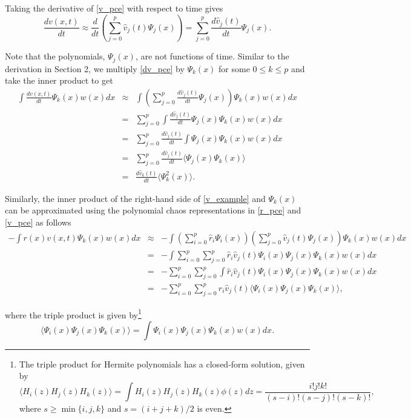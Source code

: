 \documentclass[11pt]{article}
\numberwithin{equation}{section}
\begin{document}
Taking the derivative of \eqref{v_pce} with respect to time gives 
\begin{equation}
\frac{dv(x, t)}{dt} \approx \frac{d}{dt} \left( \sum_{j=0}^p \hat{v}_j(t) \Psi_j(x) \right) = \sum_{j=0}^p \frac{d \hat{v}_j(t)}{dt} \Psi_j(x). \label{dv_pce}
\end{equation}

Note that the polynomials, $\Psi_j(x)$, are not functions of time. Similar to the derivation in Section 2, we multiply \eqref{dv_pce} by $\Psi_k(x)$ for some $0 \leq k \leq  p$ and take the inner product to get
\begin{eqnarray}
\int \frac{dv(x, t)}{dt} \Psi_k(x) w(x) dx & \approx & \int \left( \sum_{j=0}^p \frac{d\hat{v}_j(t)}{dt} \Psi_j(x) \right) \Psi_k(x) w(x) dx  \nonumber \\
& = & \sum_{j=0}^p \int \frac{d\hat{v}_j(t)}{dt} \Psi_j(x) \Psi_k(x) w(x) dx \nonumber \\
& = & \sum_{j=0}^p \frac{d\hat{v}_j(t)}{dt} \int \Psi_j(x) \Psi_k(x) w(x) dx \nonumber \\
& = & \sum_{j=0}^p \frac{d\hat{v}_j(t)}{dt} \langle \Psi_j(x) \Psi_k(x) \rangle \nonumber \\
& = & \frac{d\hat{v}_k(t)}{dt} \langle \Psi_k^2(x) \rangle. \label{lhs}
\end{eqnarray}

Similarly, the inner product of the right-hand side of \eqref{v_example} and $\Psi_k(x)$ can be approximated using the polynomial chaos representations in \eqref{r_pce} and \eqref{v_pce} as follows
\begin{eqnarray}
 - \int r(x) v(x, t) \Psi_k(x) w(x) dx & \approx & - \int \left( \sum_{i=0}^p \hat{r}_i \Psi_i(x) \right) \left( \sum_{j=0}^p \hat{v}_j(t) \Psi_j(x) \right) \Psi_k(x) w(x) dx \nonumber \\
& = & - \int \sum_{i=0}^p \sum_{j=0}^p \hat{r}_i \hat{v}_j(t) \Psi_i(x) \Psi_j(x) \Psi_k(x) w(x) dx \nonumber \\
& = & - \sum_{i=0}^p \sum_{j=0}^p \int \hat{r}_i \hat{v}_j(t) \Psi_i(x) \Psi_j(x) \Psi_k(x) w(x) dx \nonumber \\
& = & - \sum_{i=0}^p \sum_{j=0}^p \hat{r}_i \hat{v}_j(t) \langle \Psi_i(x) \Psi_j(x) \Psi_k(x) \rangle, \label{rhs}
\end{eqnarray}

where the triple product is given by\footnote{The triple product for Hermite polynomials has a closed-form solution, given by
\begin{equation*}
\langle H_i(z) H_j(z) H_k(z) \rangle = \int H_i(z) H_j(z) H_k(z) \phi(z) dz = \frac{i! j! k!}{(s-i)! (s-j)! (s-k)!},
\end{equation*}
where $s \geq \min\{i, j, k\}$ and $s = (i + j + k)/2$ is even.}
\begin{equation}
\langle \Psi_i(x) \Psi_j(x) \Psi_k(x) \rangle = \int \Psi_i(x) \Psi_j(x) \Psi_k(x) w(x) dx. \label{tp}
\end{equation}
\end{document}
